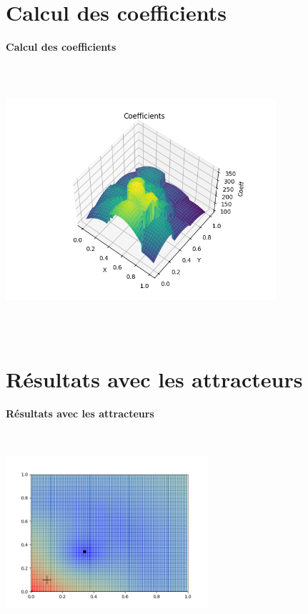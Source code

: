 \documentclass[10pt]{beamer}
\begin{document}
\section{Calcul des coefficients}
\begin{frame}{\textbf{Calcul des coefficients}}

    \begin{center}
        \includegraphics[height=10cm, width=10cm, keepaspectratio=true]{../../Figure_Coeff.png}
    \end{center}

\end{frame}


\section{Résultats avec les attracteurs}
\begin{frame}{\textbf{Résultats avec les attracteurs}}

    \begin{center}
        \includegraphics[height=7.5cm, width=7.5cm]{../../Figure_1pt_1att5.png}
    \end{center}

\end{frame}
\end{document}
